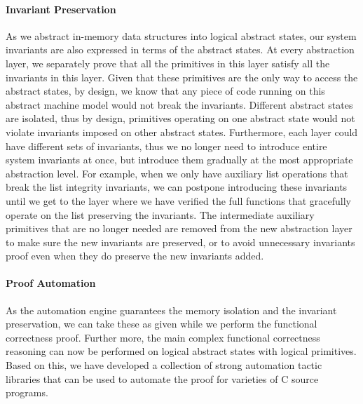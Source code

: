 \paragraph{Invariant Preservation}
As we abstract in-memory data structures into logical abstract states, our system invariants
are also expressed in terms of the abstract states. At every abstraction layer, we separately
prove that all the primitives in this layer satisfy all the invariants in this layer. Given that these
primitives are the only way to access the abstract states, by design, we know that any piece of
code running on this abstract machine model would not break the invariants. 
Different abstract states are isolated, thus by design, primitives operating on one abstract
state would not violate invariants imposed on other abstract states.
Furthermore, each
layer could have different sets of invariants, thus we no longer need to introduce entire system
invariants at once, but introduce them gradually at the most appropriate abstraction level.
For example, when we only have auxiliary list operations that break the list integrity invariants,
we can postpone introducing these invariants until we get to the layer where we have
verified the full functions that gracefully operate on the list preserving the invariants.
The intermediate auxiliary primitives that are no longer needed are removed from the new abstraction
layer to make sure the new invariants are preserved, or to avoid unnecessary invariants proof
even when they do preserve the new invariants added.


\paragraph{Proof Automation}
As the automation engine guarantees the memory isolation and the invariant
preservation, we can take these as given while we perform the functional
correctness proof. Further more, the main complex functional correctness
reasoning can now be performed on logical abstract states with logical
primitives. Based on this, we have developed a collection of strong
automation tactic libraries that can be used to automate the
proof for varieties of C source programs.


